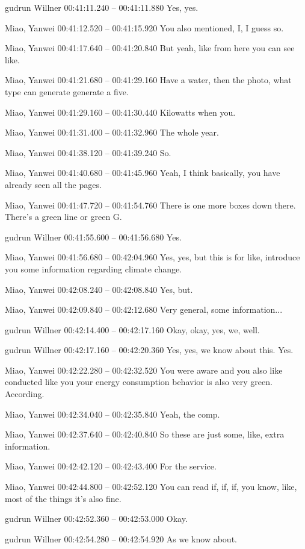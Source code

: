 {gudrun Willner 00:41:11.240 -- 00:41:11.880
Yes, yes.

Miao, Yanwei 00:41:12.520 -- 00:41:15.920
You also mentioned, I, I guess so.

Miao, Yanwei 00:41:17.640 -- 00:41:20.840
But yeah, like from here you can see like.

Miao, Yanwei 00:41:21.680 -- 00:41:29.160
Have a water, then the photo, what type can generate generate a five.

Miao, Yanwei 00:41:29.160 -- 00:41:30.440
Kilowatts when you.

Miao, Yanwei 00:41:31.400 -- 00:41:32.960
The whole year.

Miao, Yanwei 00:41:38.120 -- 00:41:39.240
So.

Miao, Yanwei 00:41:40.680 -- 00:41:45.960
Yeah, I think basically, you have already seen all the pages.

Miao, Yanwei 00:41:47.720 -- 00:41:54.760
There is one more boxes down there. There's a green line or green G.

gudrun Willner 00:41:55.600 -- 00:41:56.680
Yes.

Miao, Yanwei 00:41:56.680 -- 00:42:04.960
Yes, yes, but this is for like, introduce you some information regarding climate change.

Miao, Yanwei 00:42:08.240 -- 00:42:08.840
Yes, but.

Miao, Yanwei 00:42:09.840 -- 00:42:12.680
Very general, some information...

gudrun Willner 00:42:14.400 -- 00:42:17.160
Okay, okay, yes, we, well.

gudrun Willner 00:42:17.160 -- 00:42:20.360
Yes, yes, we know about this. Yes.

Miao, Yanwei 00:42:22.280 -- 00:42:32.520
You were aware and you also like conducted like you your energy consumption behavior is also very green. According.

Miao, Yanwei 00:42:34.040 -- 00:42:35.840
Yeah, the comp.

Miao, Yanwei 00:42:37.640 -- 00:42:40.840
So these are just some, like, extra information.

Miao, Yanwei 00:42:42.120 -- 00:42:43.400
For the service.

Miao, Yanwei 00:42:44.800 -- 00:42:52.120
You can read if, if, if, you know, like, most of the things it's also fine.

gudrun Willner 00:42:52.360 -- 00:42:53.000
Okay.

gudrun Willner 00:42:54.280 -- 00:42:54.920
As we know about.

}
